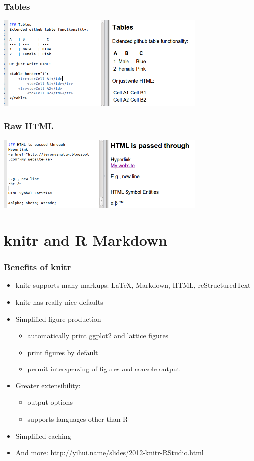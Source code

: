 \begin{frame}\frametitle{Tables}

\includegraphics[width=4in]{figures/tables.png}

\end{frame}

\begin{frame}\frametitle{Raw HTML}

\includegraphics[width=4in]{figures/html.png}

\end{frame}

\section{knitr and R Markdown}

\begin{frame}[fragile]\frametitle{Benefits of knitr}

\begin{itemize}
\item
  knitr supports many markups: LaTeX, Markdown, HTML, reStructuredText
\item
  knitr has really nice defaults
\item
  Simplified figure production

  \begin{itemize}
  \item
    automatically print ggplot2 and lattice figures
  \item
    print figures by default
  \item
    permit interspersing of figures and console output
  \end{itemize}
\item
  Greater extensibility:

  \begin{itemize}
  \item
    output options
  \item
    supports languages other than R
  \end{itemize}
\item
  Simplified caching
\item
  And more: \url{http://yihui.name/slides/2012-knitr-RStudio.html}
\end{itemize}

\end{frame}

